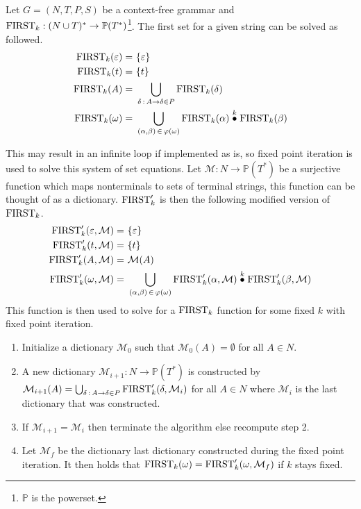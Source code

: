 \begin{algorithm}
    \label{algorithm:first}
    Let $G = (N, T, P, S)$ be a context-free grammar and $\text{FIRST}_k: (N \cup T)^* \to \mathbb{P}(T^*)$\footnote{$\mathbb{P}$ is the powerset.}. The first set for a given string can be solved as followed.
    \begin{align*}
        \FIRST_k(\varepsilon) =&\,\, \{\varepsilon\} \\
        \FIRST_k(t) =&\,\, \{t\} \\
        \FIRST_k(A) =&\,\, \bigcup_{\delta \, : \, A \to \delta \in P} \FIRST_k(\delta) \\
        \FIRST_k(\omega) =&\,\, \bigcup_{(\alpha, \beta) \, \in \, \varphi(\omega)} \FIRST_k(\alpha) \truncprod{k} \FIRST_k(\beta)
    \end{align*}
\end{algorithm}
\noindent This may result in an infinite loop if implemented as is, so fixed point iteration is used to solve this system of set equations. Let $\mathcal{M}: N \to \mathbb{P}(T^*)$ be a surjective function which maps nonterminals to sets of terminal strings, this function can be thought of as a dictionary. $\text{FIRST}'_k$ is then the following modified version of $\text{FIRST}_k$.
\begin{align*}
    \FIRST'_k(\varepsilon, \mathcal{M}) =&\,\, \{\varepsilon\} \\
    \FIRST'_k(t, \mathcal{M}) =&\,\, \{t\} \\
    \FIRST'_k(A, \mathcal{M}) =&\,\, \mathcal{M}(A) \\
    \FIRST'_k(\omega, \mathcal{M}) =&\,\, \bigcup_{(\alpha, \beta) \, \in \, \varphi(\omega)} \FIRST'_k(\alpha, \mathcal{M}) \truncprod{k} \FIRST'_k(\beta, \mathcal{M})
\end{align*}
This function is then used to solve for a $\text{FIRST}_k$ function for some fixed $k$ with fixed point iteration.
\begin{enumerate}
    \item Initialize a dictionary $\mathcal{M}_0$ such that $\mathcal{M}_0(A) = \emptyset$ for all $A \in N$.
    \item A new dictionary $\mathcal{M}_{i+1}: N \to \mathbb{P}(T^*)$ is constructed by $\mathcal{M}_{i+1}(A) = \bigcup_{\delta \, : \, A \to \delta \in P} \text{FIRST}'_k(\delta, \mathcal{M}_{i})$ for all $A \in N$ where $\mathcal{M}_{i}$ is the last dictionary that was constructed.
    \item If $\mathcal{M}_{i + 1} = \mathcal{M}_{i}$ then terminate the algorithm else recompute step 2.
    \item Let $\mathcal{M}_f$ be the dictionary last dictionary constructed during the fixed point iteration. It then holds that $\text{FIRST}_k(\omega) = \text{FIRST}'_k(\omega, \mathcal{M}_f)$ if $k$ stays fixed.
\end{enumerate}
